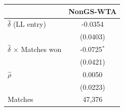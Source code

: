 \begin{tabular}{lc}
\toprule
 & NonGS-WTA \\
\midrule
$\hat{\delta}$ (LL entry) & -0.0354 \\
 & (0.0403) \\
$\hat{\delta}$ $\times$ Matches won & -0.0725$^{*}$ \\
 & (0.0421) \\
$\hat{\rho}$ & 0.0050 \\
 & (0.0223) \\
\midrule
Matches & 47,376 \\
\bottomrule
\end{tabular}
